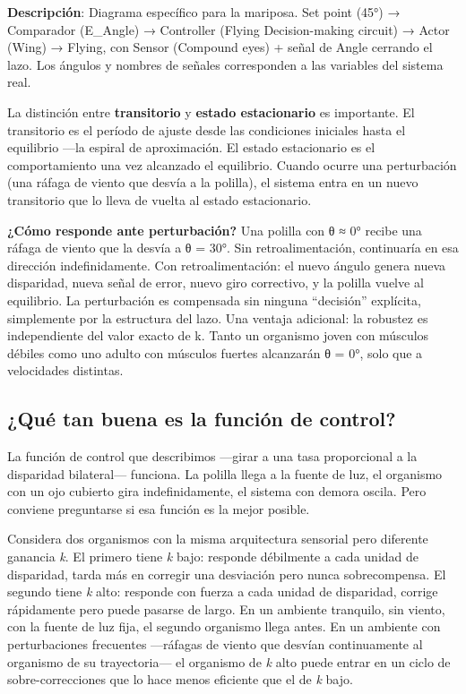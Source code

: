 \documentclass[
  letterpaper,
  DIV=11,
  numbers=noendperiod]{scrreprt}
\begin{document}
\begin{tcolorbox}[enhanced jigsaw, toprule=.15mm, arc=.35mm, colback=white, opacityback=0, colframe=quarto-callout-note-color-frame, breakable, rightrule=.15mm, left=2mm, leftrule=.75mm, bottomrule=.15mm]

\textbf{Descripción}: Diagrama específico para la mariposa. Set point
(45°) → Comparador (E\_Angle) → Controller (Flying Decision-making
circuit) → Actor (Wing) → Flying, con Sensor (Compound eyes) + señal de
Angle cerrando el lazo. Los ángulos y nombres de señales corresponden a
las variables del sistema real.

La distinción entre \textbf{transitorio} y \textbf{estado estacionario}
es importante. El transitorio es el período de ajuste desde las
condiciones iniciales hasta el equilibrio ---la espiral de aproximación.
El estado estacionario es el comportamiento una vez alcanzado el
equilibrio. Cuando ocurre una perturbación (una ráfaga de viento que
desvía a la polilla), el sistema entra en un nuevo transitorio que lo
lleva de vuelta al estado estacionario.

\textbf{¿Cómo responde ante perturbación?} Una polilla con θ ≈ 0° recibe
una ráfaga de viento que la desvía a θ = 30°. Sin retroalimentación,
continuaría en esa dirección indefinidamente. Con retroalimentación: el
nuevo ángulo genera nueva disparidad, nueva señal de error, nuevo giro
correctivo, y la polilla vuelve al equilibrio. La perturbación es
compensada sin ninguna ``decisión'' explícita, simplemente por la
estructura del lazo. Una ventaja adicional: la robustez es independiente
del valor exacto de k. Tanto un organismo joven con músculos débiles
como uno adulto con músculos fuertes alcanzarán θ = 0°, solo que a
velocidades distintas.

\subsection{¿Qué tan buena es la función de
control?}\label{quuxe9-tan-buena-es-la-funciuxf3n-de-control}

La función de control que describimos ---girar a una tasa proporcional a
la disparidad bilateral--- funciona. La polilla llega a la fuente de
luz, el organismo con un ojo cubierto gira indefinidamente, el sistema
con demora oscila. Pero conviene preguntarse si esa función es la mejor
posible.

Considera dos organismos con la misma arquitectura sensorial pero
diferente ganancia \emph{k}. El primero tiene \emph{k} bajo: responde
débilmente a cada unidad de disparidad, tarda más en corregir una
desviación pero nunca sobrecompensa. El segundo tiene \emph{k} alto:
responde con fuerza a cada unidad de disparidad, corrige rápidamente
pero puede pasarse de largo. En un ambiente tranquilo, sin viento, con
la fuente de luz fija, el segundo organismo llega antes. En un ambiente
con perturbaciones frecuentes ---ráfagas de viento que desvían
continuamente al organismo de su trayectoria--- el organismo de \emph{k}
alto puede entrar en un ciclo de sobre-correcciones que lo hace menos
eficiente que el de \emph{k} bajo.


\end{tcolorbox}
\end{document}
